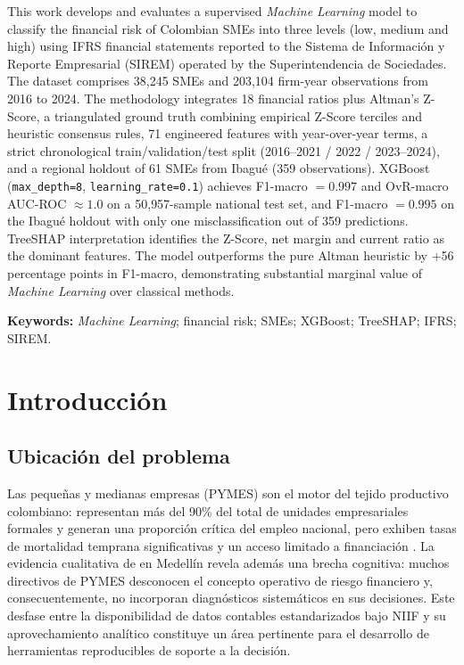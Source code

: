 \documentclass[12pt, letterpaper]{article}
\newcommand{\zaltscore}{Z\textquotesingle\textquotesingle-Score}
\begin{document}
This work develops and evaluates a supervised \textit{Machine Learning} model to classify the financial risk of Colombian SMEs into three levels (low, medium and high) using IFRS financial statements reported to the Sistema de Informaci\'on y Reporte Empresarial (SIREM) operated by the Superintendencia de Sociedades. The dataset comprises 38{,}245 SMEs and 203{,}104 firm-year observations from 2016 to 2024. The methodology integrates 18 financial ratios plus Altman's \zaltscore{}, a triangulated ground truth combining empirical Z-Score terciles and heuristic consensus rules, 71 engineered features with year-over-year terms, a strict chronological train/validation/test split (2016--2021 / 2022 / 2023--2024), and a regional holdout of 61 SMEs from Ibagu\'e (359 observations). XGBoost (\texttt{max\_depth=8}, \texttt{learning\_rate=0.1}) achieves F1-macro $= 0.997$ and OvR-macro AUC-ROC $\approx 1.0$ on a 50{,}957-sample national test set, and F1-macro $= 0.995$ on the Ibagu\'e holdout with only one misclassification out of 359 predictions. TreeSHAP interpretation identifies the \zaltscore{}, net margin and current ratio as the dominant features. The model outperforms the pure Altman heuristic by +56 percentage points in F1-macro, demonstrating substantial marginal value of \textit{Machine Learning} over classical methods.

\vspace{0.6em}
\noindent\textbf{Keywords:} \emph{Machine Learning}; financial risk; SMEs; XGBoost; TreeSHAP; IFRS; SIREM.

\newpage

\section{Introducci\'on}

\subsection{Ubicaci\'on del problema}
\label{sec:ubicacion}

Las peque\~nas y medianas empresas (PYMES) son el motor del tejido productivo colombiano: representan m\'as del 90\% del total de unidades empresariales formales y generan una proporci\'on cr\'itica del empleo nacional, pero exhiben tasas de mortalidad temprana significativas y un acceso limitado a financiaci\'on \citep{HigueraVargas2021}. La evidencia cualitativa de \citet{CardonaZuleta2025} en Medell\'in revela adem\'as una brecha cognitiva: muchos directivos de PYMES desconocen el concepto operativo de riesgo financiero y, consecuentemente, no incorporan diagn\'osticos sistem\'aticos en sus decisiones. Este desfase entre la disponibilidad de datos contables estandarizados bajo NIIF y su aprovechamiento anal\'itico constituye un \'area pertinente para el desarrollo de herramientas reproducibles de soporte a la decisi\'on.
\end{document}
